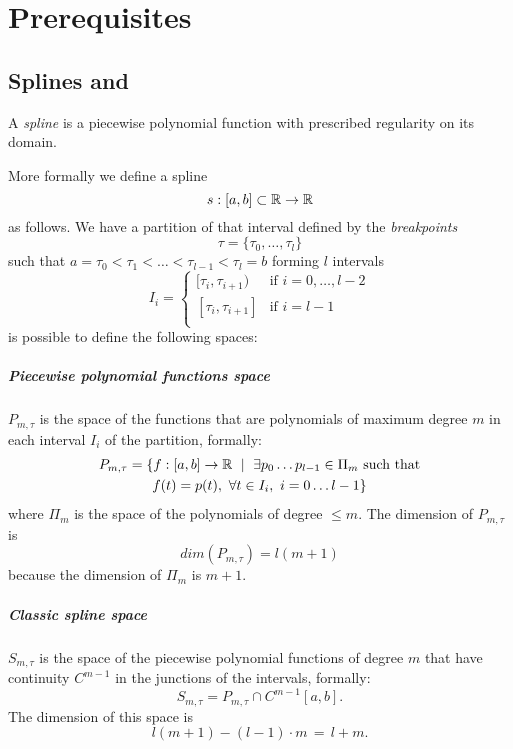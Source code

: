 \documentclass[dissertation.tex]{subfiles}
\begin{document}
\chapter{Prerequisites}
\section{Splines and \bss}\label{sec:spline}
A \emph{spline} is a piecewise polynomial function with prescribed
regularity on its domain.

More formally we define a spline \cite{deboor}\cite{farin}\cite{salomon}\cite{bartels}
$$s:[a,b]\subset\mathbb{R}\rightarrow\mathbb{R}$$
as follows.
We have a partition of that interval defined by the \emph{breakpoints}
$$\tau = \{\tau_0,\dots,\tau_l\}$$
such that $a=\tau_0<\tau_1<\dots<\tau_{l-1}<\tau_l=b$ forming $l$
intervals
$$
I_i=
\begin{cases}
  [\tau_i,\tau_{i+1}) & \mbox{if } i=0,\dots,l-2\\
    [\tau_i,\tau_{i+1}] & \mbox{if } i=l-1\\
\end{cases}
$$
is possible to define the following spaces:
\paragraph{Piecewise polynomial functions space} $P_{m,\tau}$
is the space of the functions that are polynomials of maximum degree $m$
in each interval $I_i$ of the partition, formally:
\begin{multline*}
  P_{m,\tau}=\{f:[a,b]\rightarrow\mathbb{R}\ \mid\ \exists p_0\dots
  p_{l-1}\in\Pi_m \ \text{such that}\\
  f(t)=p(t),\ \forall t\in I_i,\
  i=0\dots l-1\}
\end{multline*}
where $\Pi_m$ is the space of the polynomials of degree $\le m$. The
dimension of $P_{m,\tau}$ is
\begin{equation*}
  dim(P_{m,\tau})=l(m+1)
\end{equation*}
because the dimension of $\Pi_m$
is $m+1$.
\paragraph{Classic spline space} $S_{m,\tau}$ is the space of
the piecewise polynomial functions of degree $m$ that have continuity
$C^{m-1}$ in
the junctions of the intervals, formally:
$$
S_{m,\tau}=P_{m,\tau}\cap C^{m-1}[a,b].
$$
The dimension of this space is
\begin{equation}
  \label{eq:dimClassicSpline}
  l(m+1)-(l-1)\cdot m\,=\,l+m.
\end{equation}
\end{document}
